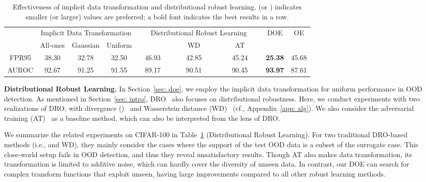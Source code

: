 \documentclass{article} \usepackage{iclr2022_conference,times}
\begin{document}
\begin{table}[]
\small
\centering
\caption{Effectiveness of implicit data transformation and distributional robust learning.  (or ) indicates smaller (or larger) values are preferred; a bold font indicates the best results in a row.  } \label{tab: aba}
\begin{tabular}{c|ccc|ccc|cc}
\toprule[1.5pt]
      & \multicolumn{3}{c}{Implicit Data Transformation} & \multicolumn{3}{|c|}{Distributional Robust Learning} & \multirow{2}{*}{DOE} & \multirow{2}{*}{OE} \\
      \cline{2-7}
      & All-ones        & Gaussian       & Uniform       & ~~~~~~~~          & ~~~~WD~~~~             & ~~~~AT~~~~            &                      &                     \\
 \midrule[1pt]
FPR95  & 38.30           & 32.78          & 32.50         & 46.93             & 42.85          & 45.24         & \textbf{25.38}                & 45.68               \\
AUROC  & 92.67           & 91.25          & 91.55         & 89.17             & 90.51          & 90.45         & \textbf{93.97}                & 87.61               \\
\bottomrule[1.5pt]
\end{tabular}
\end{table}




\textbf{Distributional Robust Learning.} In Section~\ref{sec: doe}, we employ the implicit data transformation for uniform performance in OOD detection. As mentioned in Section~\ref{sec: intro}, DRO~\citep{rahimian2019distributionally} also focuses on distributional robustness. Here, we conduct experiments with two realizations of DRO, with  divergence ()~\citep{hashimoto2018fairness} and Wasserstein distance (WD)~\citep{KwonKWP20} (cf., Appendix~\ref{app: alg}). We also consider the adversarial training (AT)~\citep{madry2017towards} as a baseline method, which can also be interpreted from the lens of DRO.





We summarize the related experiments on CIFAR-100 in Table~\ref{tab: aba} (Distributional Robust Learning). For two traditional DRO-based methods (i.e.,  and WD), they mainly consider the cases where the support of the test OOD data is a subset of the surrogate case. This close-world setup fails in OOD detection, and thus they reveal unsatisfactory results. Though AT also makes data transformation, its transformation is limited to additive noise, which can hardly cover the diversity of unseen data. In contrast, our DOE can search for complex transform functions that exploit unseen, having large improvements compared to all other robust learning methods. 
\end{document}
